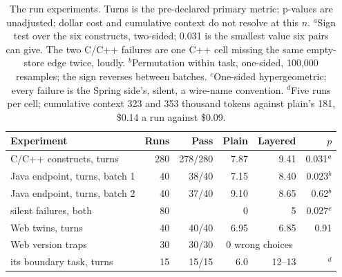 \documentclass[journal]{IEEEtran}
\begin{document}
\begin{table}[!t]
\centering
\footnotesize\setlength{\tabcolsep}{3pt}
\begin{tabular}{@{}lrrrrr@{}}
\toprule
Experiment & Runs & Pass & Plain & Layered & $p$ \\
\midrule
C/C++ constructs, turns & 280 & 278/280 & 7.87 & 9.41 & 0.031$^{a}$ \\
Java endpoint, turns, batch 1 & 40 & 38/40 & 7.15 & 8.40 & 0.023$^{b}$ \\
Java endpoint, turns, batch 2 & 40 & 37/40 & 9.10 & 8.65 & 0.62$^{b}$ \\
\;\;silent failures, both & 80 & & 0 & 5 & 0.027$^{c}$ \\
Web twins, turns & 40 & 40/40 & 6.95 & 6.85 & 0.91 \\
Web version traps & 30 & 30/30 & \multicolumn{2}{c}{0 wrong choices} & \\
\;\;its boundary task, turns & 15 & 15/15 & 6.0 & 12--13 & $^{d}$ \\
\bottomrule
\end{tabular}
\caption{The run experiments. Turns is the pre-declared primary metric;
p-values are unadjusted; dollar cost and cumulative context do not
resolve at this $n$. $^{a}$Sign test over the
six constructs, two-sided; 0.031 is the smallest value six pairs can
give. The two C/C++ failures are one C++ cell missing the same
empty-store edge twice, loudly. $^{b}$Permutation within task,
one-sided, 100{,}000 resamples; the sign reverses between batches.
$^{c}$One-sided hypergeometric; every failure is the Spring side's,
silent, a wire-name convention. $^{d}$Five runs per cell; cumulative
context 323 and 353 thousand tokens against plain's 181, \$0.14 a run
against \$0.09.}
\label{tab:stats}
\end{table}
\end{document}
